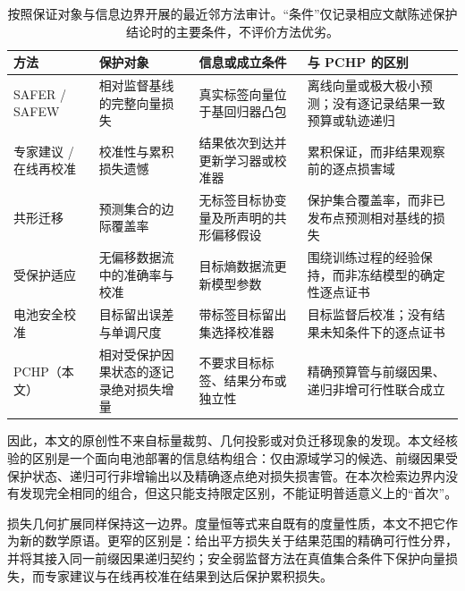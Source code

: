 \documentclass[UTF8,11pt]{ctexart}
\begin{document}
\begin{table}[t]
  \centering
  \caption{按照保证对象与信息边界开展的最近邻方法审计。“条件”仅记录相应文献陈述保护结论时的主要条件，不评价方法优劣。}
  \label{tab:novelty_audit_zh}
  \small
  \begin{tabularx}{\textwidth}{@{}>{\raggedright\arraybackslash}p{}>{\raggedright\arraybackslash}p{}>{\raggedright\arraybackslash}p{}>{\raggedright\arraybackslash}X@{}}
    \toprule
    方法 & 保护对象 & 信息或成立条件 & 与 PCHP 的区别 \\
    \midrule
    SAFER / SAFEW \citep{li2017safer,li2021safeweak} & 相对监督基线的完整向量损失 & 真实标签向量位于基回归器凸包 & 离线向量或极大极小预测；没有逐记录结果一致预算或轨迹递归 \\
    专家建议 / 在线再校准 \citep{chernov2009evaluators,marx2025calibrated,deshpande2025calibrated} & 校准性与累积损失遗憾 & 结果依次到达并更新学习器或校准器 & 累积保证，而非结果观察前的逐点损害域 \\
    共形迁移 \citep{tuwani2023transport,filgueira2026conformalized} & 预测集合的边际覆盖率 & 无标签目标协变量及所声明的共形偏移假设 & 保护集合覆盖率，而非已发布点预测相对基线的损失 \\
    受保护适应 \citep{bar2024protected} & 无偏移数据流中的准确率与校准 & 目标熵数据流更新模型参数 & 围绕训练过程的经验保持，而非冻结模型的确定性逐点证书 \\
    电池安全校准 \citep{nyachionjeka2026safecalibrated} & 目标留出误差与单调尺度 & 带标签目标留出集选择校准器 & 目标监督后校准；没有结果未知条件下的逐点证书 \\
    PCHP（本文） & 相对受保护因果状态的逐记录绝对损失增量 & 不要求目标标签、结果分布或独立性 & 精确预算管与前缀因果、递归非增可行性联合成立 \\
    \bottomrule
  \end{tabularx}
\end{table}
\FloatBarrier

因此，本文的原创性不来自标量裁剪、几何投影或对负迁移现象的发现。本文经核验的区别是一个面向电池部署的信息结构组合：仅由源域学习的候选、前缀因果受保护状态、递归可行非增输出以及精确逐点绝对损失损害管。在本次检索边界内没有发现完全相同的组合，但这只能支持限定区别，不能证明普适意义上的“首次”。

损失几何扩展同样保持这一边界。度量恒等式来自既有的度量性质，本文不把它作为新的数学原语。更窄的区别是：给出平方损失关于结果范围的精确可行性分界，并将其接入同一前缀因果递归契约；安全弱监督方法在真值集合条件下保护向量损失，而专家建议与在线再校准在结果到达后保护累积损失。
\end{document}
